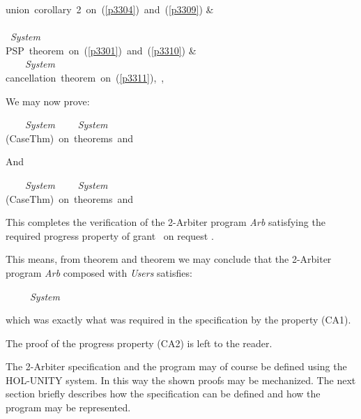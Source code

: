 \begin{thm}
 \cnnn  \mbox{union corollary 2 on (\ref{p3304}) and (\ref{p3309})}     &\\
 \rqa\;\mand\;\mnot\gra\;\mand\;\grb\ \leadto\
        \rqa\;\mand\;\mnot\gra\;\mand\;\mnot\rqb\;\mand\;\mnot\grb\ \mor\
        \rqa\;\mand\;\mnot\grb\ \mor\
        \gra\\
             \hspace{8cm} \mmin\ {\it System}\nb[p3311]\\
 \cnnn  \mbox{PSP theorem on (\ref{p3301}) and (\ref{p3310})}     &\\
 \rqa\;\mand\;\mnot\gra\;\mand\;\grb\ \leadto\ \gra\
                     \mmin\ {\it System}\nb[p3312]\\
 \cnnn \mbox{cancellation theorem on (\ref{p3311}), ,
                                      \tref{head30}}
\end{thm}

We may now prove:
\begin{thm}
     \rqa\;\mand\;\gra\ \leadto\ \gra\ \mmin\ {\it System}\nb[head34]
\p
     \rqa\;\mand\;\gra\ \leadto\ \gra\ \mmin\ {\it System}\nb[p341]\\
 \cnnn  \mbox{(CaseThm) on theorems  and }
\end{thm}

And
\begin{thm}
     \rqa\ \leadto\ \gra\ \mmin\ {\it System}\nb[head35]
\p
     \rqa\ \leadto\ \gra\ \mmin\ {\it System}\nb[p351]\\
 \cnnn  \mbox{(CaseThm) on theorems  and }
\end{thm}

This completes the verification of the 2-Arbiter program {\it Arb} satisfying
the required progress property of grant \gra\ on request \rqa.

This means, from theorem  and theorem  we may
conclude that the 2-Arbiter program {\it Arb} composed with {\it Users}
satisfies:
\begin{center}
   \mforall\ \rqi\ \leadto\ \gri\ \mmin\ {\it System}
\end{center}
which was exactly what was required in the specification by the property
(CA1).

The proof of the progress property (CA2) is left to the reader.

\bigskip
The 2-Arbiter specification and the program may of course be defined using the 
HOL-UNITY system.  In this way the shown proofs may be mechanized.  The next
section briefly describes how the specification can be defined and how the
program may be represented.


